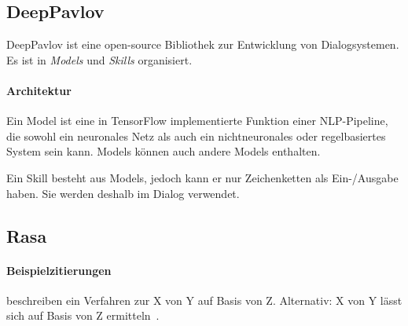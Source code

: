 \subsection{DeepPavlov}
DeepPavlov ist eine open-source Bibliothek zur Entwicklung von Dialogsystemen.
Es ist in \emph{Models} und \emph{Skills} organisiert.

\paragraph{Architektur}
Ein Model ist eine in TensorFlow implementierte Funktion einer NLP-Pipeline,
die sowohl ein neuronales Netz als auch ein nichtneuronales oder regelbasiertes System sein kann.
Models können auch andere Models enthalten.

Ein Skill besteht aus Models, jedoch kann er nur Zeichenketten als Ein-/Ausgabe haben.
Sie werden deshalb im Dialog verwendet.

\subsection{Rasa}


\paragraph{Beispielzitierungen}
\citet{sniktec} beschreiben ein Verfahren zur X von Y auf Basis von Z.
Alternativ: X von Y lässt sich auf Basis von Z ermitteln~\citep{sniktec}.
